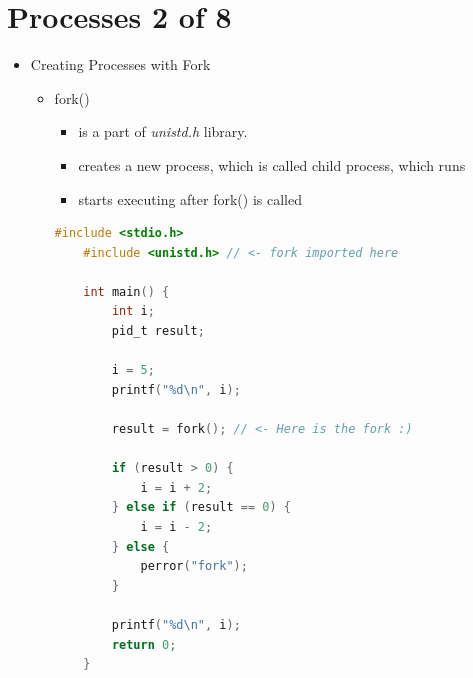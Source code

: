 \documentclass[12pt]{article}
\begin{document}
\bigskip

\section*{Processes 2 of 8}

\bigskip

\begin{itemize}
    \item Creating Processes with Fork
    \begin{itemize}
        \item fork()
        \begin{itemize}
            \item is a part of \textit{unistd.h} library.
            \item creates a new process, which is called child process, which runs
            \item starts executing after fork() is called
        \end{itemize}

        \bigskip

    \begin{lstlisting}[language=c]
    #include <stdio.h>
    #include <unistd.h> // <- fork imported here

    int main() {
        int i;
        pid_t result;

        i = 5;
        printf("%d\n", i);

        result = fork(); // <- Here is the fork :)

        if (result > 0) {
            i = i + 2;
        } else if (result == 0) {
            i = i - 2;
        } else {
            perror("fork");
        }

        printf("%d\n", i);
        return 0;
    }
    \end{lstlisting}

    \end{itemize}
\end{itemize}
\end{document}
